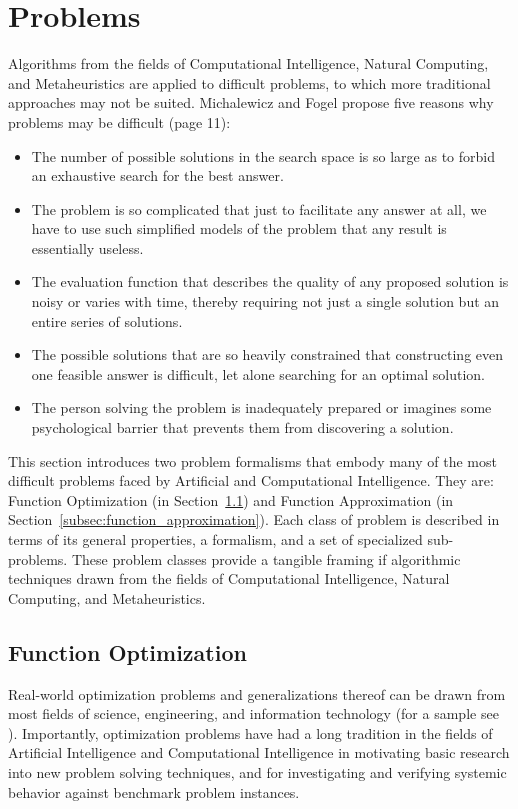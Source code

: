 \documentclass[a4paper, 11pt]{article}
\begin{document}
\section{Problems}
\label{sec:problems}
Algorithms from the fields of Computational Intelligence, Natural Computing, and Metaheuristics are applied to difficult problems, to which more traditional approaches may not be suited.
Michalewicz and Fogel propose five reasons why problems may be difficult \cite{Michalewicz2004} (page 11):
\begin{itemize}
	\item The number of possible solutions in the search space is so large as to forbid an exhaustive search for the best answer.
	\item The problem is so complicated that just to facilitate any answer at all, we have to use such simplified models of the problem that any result is essentially useless.
	\item The evaluation function that describes the quality of any proposed solution is noisy or varies with time, thereby requiring not just a single solution but an entire series of solutions.
	\item The possible solutions that are so heavily constrained that constructing even one feasible answer is difficult, let alone searching for an optimal solution.
	\item The person solving the problem is inadequately prepared or imagines some psychological barrier that prevents them from discovering a solution.
\end{itemize}

This section introduces two problem formalisms that embody many of the most difficult problems faced by Artificial and Computational Intelligence. They are: Function Optimization (in Section~\ref{subsec:function_optimization}) and Function Approximation (in Section~\ref{subsec:function_approximation}). Each class of problem is described in terms of its general properties, a formalism, and a set of specialized sub-problems. These problem classes provide a tangible framing if algorithmic techniques drawn from the fields of Computational Intelligence, Natural Computing, and Metaheuristics.

% 
%
\subsection{Function Optimization}
\label{subsec:function_optimization}
Real-world optimization problems and generalizations thereof can be drawn from most fields of science, engineering, and information technology (for a sample see \cite{Ali1997, Toern1999}). Importantly, optimization problems have had a long tradition in the fields of Artificial Intelligence and Computational Intelligence in motivating basic research into new problem solving techniques, and for investigating and verifying systemic behavior against benchmark problem instances.
\end{document}

